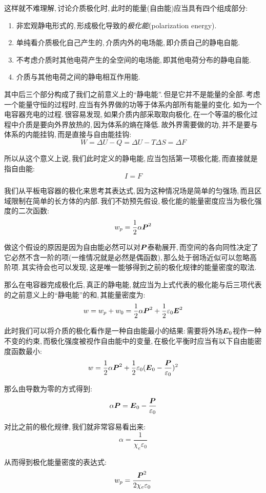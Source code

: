 这样就不难理解,\,讨论介质极化时,\,此时的能量(自由能)应当具有四个组成部分:
\begin{enumerate}
	\item 非宏观静电形式的,\,形成极化导致的\emph{极化能}(polarization energy).
	\item 单纯看介质极化自己产生的,\,介质内外的电场能,\,即介质自己的静电自能.
	\item 不考虑介质时其他电荷产生的全空间的电场能,\,即其他电荷分布的静电自能.
	\item 介质与其他电荷之间的静电相互作用能.
\end{enumerate}

其中后三个部分构成了我们之前意义上的``静电能''.\,但是它并不是能量的全部.\,考虑一个能量守恒的过程时,\,应当有外界做的功等于体系内部所有能量的变化.\,如为一个电容器充电的过程.\,很容易发现,\,如果介质内部采取取向极化,\,在一个等温的极化过程中介质是要向外界放热的,\,因为体系的熵在降低.\,故外界需要做的功,\,并不是要与体系的内能挂钩,\,而是直接与自由能挂钩:
\[W=\Delta U-Q=\Delta U-T\Delta S=\Delta F\]

所以从这个意义上说,\,我们此时定义的静电能,\,应当包括第一项极化能,\,而直接就是指自由能:
\[I=F\]

我们从平板电容器的极化来思考其表达式,\,因为这种情况场是简单的匀强场,\,而且区域限制在简单的长方体的内部.\,我们不妨预先假设,\,极化能的能量密度应当为极化强度的二次函数:
\[w_p=\frac{1}{2}\alpha \boldsymbol{P}^2\]

做这个假设的原因是因为自由能必然可以对$\boldsymbol{P}$泰勒展开,\,而空间的各向同性决定了它必然不含一阶的项(一维情况就是必然是偶函数),\,那么处于弱场近似可以忽略高阶项.\,其实待会也可以发现,\,这是唯一能够得到之前的极化规律的能量密度的取法.

那么在电容器完成极化后,\,真正的静电能,\,就应当为上式代表的极化能与后三项代表的之前意义上的``静电能''的和,\,其能量密度为:
\[w=w_p+w_0=\frac{1}{2}\alpha \boldsymbol{P}^2+\frac{1}{2}\varepsilon_0 \boldsymbol{E}^2\]

此时我们可以将介质的极化看作是一种自由能最小的结果:\,需要将外场$\boldsymbol{E}_0$视作一种不变的约束,\,而极化强度被视作自由能中的变量,\,在极化平衡时应当有以下自由能密度函数最小:
\[w=\frac{1}{2}\alpha \boldsymbol{P}^2+\frac{1}{2}\varepsilon_0 (\boldsymbol{E}_0-\frac{\boldsymbol{P}}{\varepsilon_0})^2\]

那么由导数为零的方式得到:
\[\alpha\boldsymbol{P}=\boldsymbol{E}_0-\frac{\boldsymbol{P}}{\varepsilon_0}\]

对比之前的极化规律,\,我们就非常容易看出来:
\[\alpha=\frac{1}{\chi_e\varepsilon_0}\]

从而得到极化能量密度的表达式:
\[w_p=\frac{\boldsymbol{P}^2}{2\chi_e\varepsilon_0}\]


